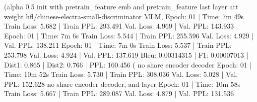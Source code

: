 \documentclass[letterpaper]{article} %
\begin{document}
\begin{CJK*}{UTF8}{gbsn}
(alpha 0.5 init with pretrain_feature emb and pretrain_feature last layer att weight hfl/chinese-electra-small-discriminator MLM, %
Epoch: 01 | Time: 7m 49s
	Train Loss: 5.682 | Train PPL: 293.491
	 Val. Loss: 4.969 |  Val. PPL: 143.933
Epoch: 01 | Time: 7m 6s
	Train Loss: 5.544 | Train PPL: 255.596
	 Val. Loss: 4.929 |  Val. PPL: 138.211
Epoch: 01 | Time: 7m 0s
	Train Loss: 5.537 | Train PPL: 253.798
	 Val. Loss: 4.924 |  Val. PPL: 137.619
Bleu: 0.00314315 | F1: 0.00007013 | Dist1: 0.865 | Dist2: 0.766 | PPL: 160.456
(%
no share encoder decoder
Epoch: 01 | Time: 10m 52s
	Train Loss: 5.730 | Train PPL: 308.036
	 Val. Loss: 5.028 |  Val. PPL: 152.628
no share encoder decoder, and layer
Epoch: 01 | Time: 10m 58s
	Train Loss: 5.667 | Train PPL: 289.087
	 Val. Loss: 4.879 |  Val. PPL: 131.536


\end{CJK*}
\end{document}
